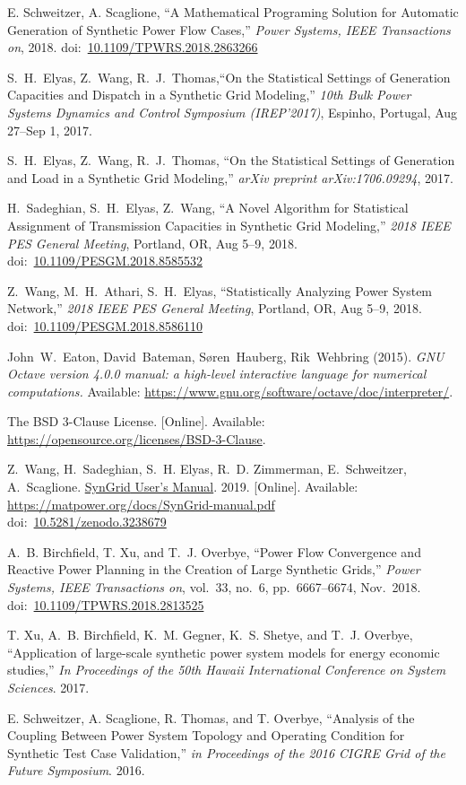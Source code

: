 \documentclass[12pt]{article}
\newcommand{\syngrid}[0]{{SynGrid}}
\newcommand{\syngridver}[0]{1.0.1}
\newcommand{\syngridmanurl}[0]{https://matpower.org/docs/SynGrid-manual-\syngridver.pdf}
\newcommand{\syngridman}[0]{\href{\syngridmanurl}{\syngrid{} User's Manual}}
\newcommand{\doi}[1]{doi:~\href{https://doi.org/#1}{#1}}
\numberwithin{equation}{section}
\numberwithin{table}{section}
\numberwithin{figure}{section}
\begin{document}
\begin{thebibliography}{99}
E. Schweitzer, A. Scaglione, ``A Mathematical Programing Solution for Automatic Generation of Synthetic Power Flow Cases,''  \emph{Power Systems, IEEE Transactions on}, 2018. \doi{10.1109/TPWRS.2018.2863266}

S.~H.~Elyas, Z.~Wang, R.~J.~Thomas,``On the Statistical Settings of Generation Capacities and Dispatch in a Synthetic Grid Modeling,'' \emph{10th Bulk Power Systems Dynamics and Control Symposium (IREP'2017)}, Espinho, Portugal, Aug 27--Sep 1, 2017.

S.~H.~Elyas, Z.~Wang, R.~J.~Thomas,
  ``On the Statistical Settings of Generation and Load in a Synthetic Grid Modeling,'' \emph{arXiv preprint arXiv:1706.09294}, 2017.

H.~Sadeghian, S.~H.~Elyas, Z.~Wang, ``A Novel Algorithm for Statistical Assignment of Transmission Capacities in Synthetic Grid Modeling,''
\emph{2018 IEEE PES General Meeting}, Portland, OR, Aug 5--9, 2018.
\doi{10.1109/PESGM.2018.8585532}

Z.~Wang, M.~H.~Athari, S.~H.~Elyas, ``Statistically Analyzing Power System Network,'' \emph{2018 IEEE PES General Meeting}, Portland, OR, Aug 5--9, 2018.
\doi{10.1109/PESGM.2018.8586110}

John~W.~Eaton, David~Bateman, S{\o}ren~Hauberg, Rik~Wehbring (2015). \emph{GNU Octave version 4.0.0 manual: a high-level interactive language for numerical computations.} Available: \url{https://www.gnu.org/software/octave/doc/interpreter/}.

The BSD 3-Clause License. [Online]. Available: \url{https://opensource.org/licenses/BSD-3-Clause}.

Z.~Wang, H.~Sadeghian, S.~H. Elyas, R.~D. Zimmerman, E.~Schweitzer,
A.~Scaglione. \syngridman{}. 2019.
[Online]. Available: \url{https://matpower.org/docs/SynGrid-manual.pdf}\\
\doi{10.5281/zenodo.3238679}

A.~B. Birchfield, T. Xu, and T.~J. Overbye, ``Power Flow Convergence and Reactive Power Planning in the Creation of Large Synthetic Grids,''  \emph{Power Systems, IEEE Transactions on}, vol.~33, no.~6, pp.~6667--6674, Nov.~2018.\\ \doi{10.1109/TPWRS.2018.2813525}

T. Xu, A.~B. Birchfield, K.~M. Gegner, K.~S. Shetye, and T.~J. Overbye, ``Application of large-scale synthetic power system models for energy economic studies,''  \emph{In Proceedings of the 50th Hawaii International Conference on System Sciences}. 2017.

E. Schweitzer, A. Scaglione, R. Thomas, and T. Overbye, ``Analysis of the Coupling Between Power System Topology and Operating Condition for Synthetic Test Case Validation,'' \emph{in Proceedings of the 2016 CIGRE Grid of the Future Symposium}. 2016.
\end{thebibliography}
\end{document}
